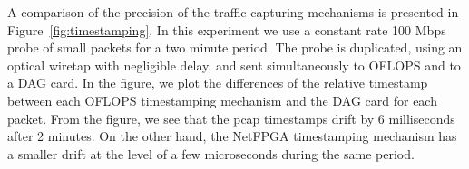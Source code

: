 A comparison of the precision of the traffic capturing mechanisms is 
presented in Figure~\ref{fig:timestamping}. In this experiment we 
use a constant rate 100 Mbps probe of small packets for a two minute 
period. The probe is duplicated, using an optical wiretap with negligible 
delay, and sent simultaneously to OFLOPS and to a DAG card. In the figure, 
we plot the differences of the relative timestamp between each OFLOPS 
timestamping mechanism and the DAG card for each packet. From the figure, 
we see that the pcap timestamps drift by 6 milliseconds after 2 minutes.
On the other hand, the NetFPGA timestamping mechanism has a smaller
drift at the level of a few microseconds during the same period.

%
%
%
%

